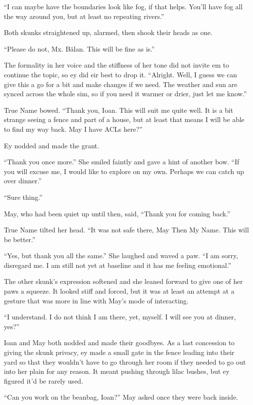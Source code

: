 ``I can maybe have the boundaries look like fog, if that helps. You'll have fog all the way around you, but at least no repeating rivers.''

Both skunks straightened up, alarmed, then shook their heads as one.

``Please do not, Mx. Bălan. This will be fine as is.''

The formality in her voice and the stiffness of her tone did not invite em to continue the topic, so ey did eir best to drop it. ``Alright. Well, I guess we can give this a go for a bit and make changes if we need. The weather and sun are synced across the whole sim, so if you need it warmer or drier, just let me know.''

True Name bowed. ``Thank you, Ioan. This will suit me quite well. It is a bit strange seeing a fence and part of a house, but at least that means I will be able to find my way back. May I have ACLs here?''

Ey nodded and made the grant.

``Thank you once more.'' She smiled faintly and gave a hint of another bow. ``If you will excuse me, I would like to explore on my own. Perhaps we can catch up over dinner.''

``Sure thing.''

May, who had been quiet up until then, said, ``Thank you for coming back.''

True Name tilted her head. ``It was not safe there, May Then My Name. This will be better.''

``Yes, but thank you all the same.'' She laughed and waved a paw. ``I am sorry, disregard me. I am still not yet at baseline and it has me feeling emotional.''

The other skunk's expression softened and she leaned forward to give one of her paws a squeeze. It looked stiff and forced, but it was at least an attempt at a gesture that was more in line with May's mode of interacting.

``I understand. I do not think I am there, yet, myself. I will see you at dinner, yes?''

Ioan and May both nodded and made their goodbyes. As a last concession to giving the skunk privacy, ey made a small gate in the fence leading into their yard so that they wouldn't have to go through her room if they needed to go out into her plain for any reason. It meant pushing through lilac bushes, but ey figured it'd be rarely used.

``Can you work on the beanbag, Ioan?'' May asked once they were back inside.

